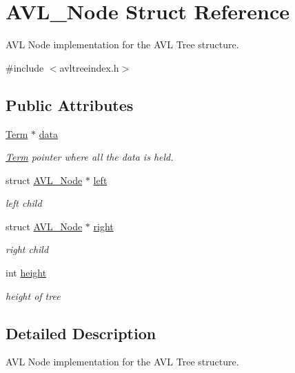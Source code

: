 \hypertarget{struct_a_v_l___node}{}\section{A\+V\+L\+\_\+\+Node Struct Reference}
\label{struct_a_v_l___node}


A\+V\+L Node implementation for the A\+V\+L Tree structure.  




{\ttfamily \#include $<$avltreeindex.\+h$>$}

\subsection*{Public Attributes}
\begin{DoxyCompactItemize}
\item 
\hyperlink{class_term}{Term} $\ast$ \hyperlink{struct_a_v_l___node_a6a9062cc45fa099a2c68763e1d52b894}{data}
\begin{DoxyCompactList}\small\item\em \hyperlink{class_term}{Term} pointer where all the data is held. \end{DoxyCompactList}\item 
struct \hyperlink{struct_a_v_l___node}{A\+V\+L\+\_\+\+Node} $\ast$ \hyperlink{struct_a_v_l___node_a7a5a4e3c99ef2c11b20a6a60aee247a8}{left}
\begin{DoxyCompactList}\small\item\em left child \end{DoxyCompactList}\item 
struct \hyperlink{struct_a_v_l___node}{A\+V\+L\+\_\+\+Node} $\ast$ \hyperlink{struct_a_v_l___node_af0d0c4d5eaf62a9141711d1a10e3ba11}{right}
\begin{DoxyCompactList}\small\item\em right child \end{DoxyCompactList}\item 
int \hyperlink{struct_a_v_l___node_a802b8e700879b7489730140f5e1fd121}{height}
\begin{DoxyCompactList}\small\item\em height of tree \end{DoxyCompactList}\end{DoxyCompactItemize}


\subsection{Detailed Description}
A\+V\+L Node implementation for the A\+V\+L Tree structure. 

